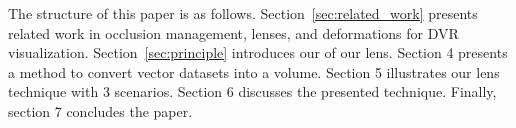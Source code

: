 

The structure of this paper is as follows. Section~\ref{sec:related_work} presents related work in occlusion management, lenses, and deformations for DVR visualization. Section~\ref{sec:principle} introduces our of our lens. Section 4 presents a method to convert vector datasets into a volume. Section 5 illustrates our lens technique with 3 scenarios. Section 6 discusses the presented technique. Finally, section 7 concludes the paper. 
